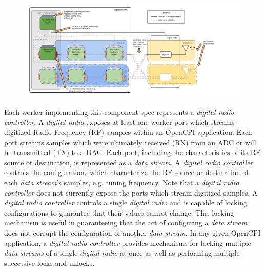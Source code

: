 \documentclass{article}
\begin{document}
    \begin{center}
      \begin{figure}[h]
        \centering\captionsetup{type=figure}\includegraphics[scale=0.21]{dig_radio_ctrlr}
        \label{fig:blockdiagram}
      \end{figure}
    \end{center}
    \noindent Each worker implementing this component spec represents a
    \textit{digital radio controller}.
    A \textit{digital radio} exposes at least one worker port which streams digitized
    Radio Frequency (RF) samples within an OpenCPI application.
    Each port streams samples which were ultimately received (RX) from an ADC or will
    be transmitted (TX) to a DAC.
    Each port, including the characteristics of its RF
    source or destination, is represented as a \textit{data stream}.
    A \textit{digital radio controller} controls the configurations which
    characterize the RF source or destination of each
    \textit{data stream}'s samples, e.g. tuning
    frequency.
    Note that a \textit{digital radio controller} does not currently expose the
    ports which stream digitized samples.
    A \textit{digital radio controller} controls a single
    \textit{digital radio} and is capable of locking configurations to guarantee
    that their values cannot change. This locking mechanism is useful in
    guaranteeing that the act of configuring a \textit{data stream}
    does not
    corrupt the configuration of another \textit{data stream}. %
    In any given OpenCPI application, a
    \textit{digital radio controller} provides mechanisms for locking multiple
    \textit{data streams} of a single \textit{digital radio} at once as well as
    performing multiple successive locks and unlocks.
\end{document}
